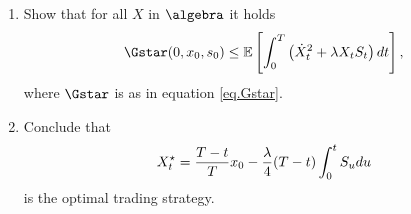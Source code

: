 \documentclass[10pt,a4paper]{article}
\begin{document}
\begin{exercise}
\begin{enumerate}[label={\textbf{\ref{ex.GS11}.\arabic{*}}}, ref={Exercise {\ref{ex.GS11}.\arabic{*}}}]
\begin{enumerate}
    \end{enumerate}
  \item 
    Show that for all $X$ in $\algebra$ it holds 
    \begin{equation}
      \Gstar(0, x_0, s_0) \leq 
      \Expectation \left[
        \int_{0}^{T} \left( \dot{X}_{t}\squared + \lambda X_t \price_t \right) dt 
        \right],
    \end{equation}
    where $\Gstar$ is as in equation \eqref{eq.Gstar}.
  \item Conclude that 
    \begin{equation}
      X^{\star}_t = \frac{T-t}{T}x_0 - \frac{\lambda}{4}(T-t) \int_{0}^{t} S_u du 
    \end{equation}
    is the optimal trading strategy. 
\end{enumerate}
\end{exercise}
\end{document}
